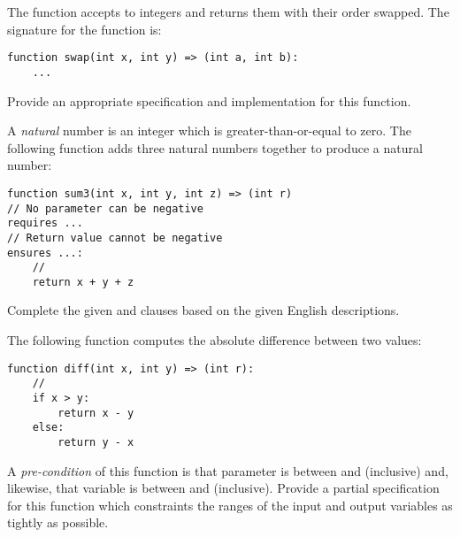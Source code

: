 \begin{ex}
The  function accepts to integers and returns them
with their order swapped.  The signature for the function is:
\begin{lstlisting}
function swap(int x, int y) => (int a, int b):
    ...
\end{lstlisting}
Provide an appropriate specification and implementation for this function.
\end{ex}

\begin{ex}

A {\em natural} number is an integer which is greater-than-or-equal to
zero.  The following function adds three natural numbers together to produce a natural number:
\begin{lstlisting}
function sum3(int x, int y, int z) => (int r)
// No parameter can be negative
requires ...
// Return value cannot be negative
ensures ...:
    //
    return x + y + z
\end{lstlisting}
Complete the given  and 
clauses based on the given English descriptions.

\end{ex}

\begin{ex}
  The following function computes the absolute difference between two values:

\begin{lstlisting}
function diff(int x, int y) => (int r):
    //
    if x > y:
        return x - y
    else:
        return y - x
\end{lstlisting}

A {\em pre-condition} of this function is that parameter 
is between  and  (inclusive) and,
likewise, that variable  is between  and
 (inclusive).  Provide a partial specification for
this function which constraints the ranges of the input and output
variables as tightly as possible.
\end{ex}

